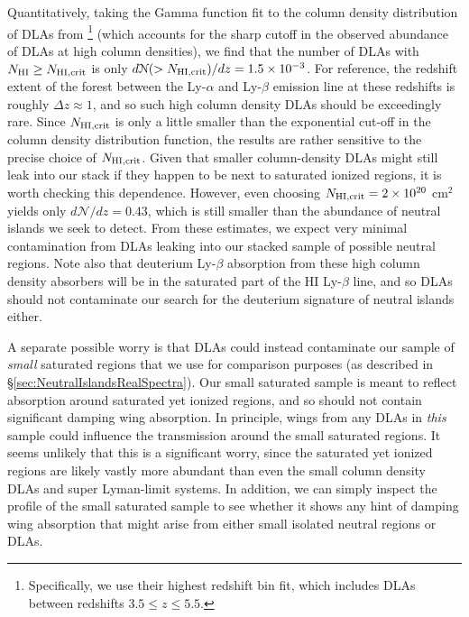 Quantitatively, taking the Gamma function
fit to the column density distribution of DLAs from \citet{Prochaska:2005wy} \footnote{Specifically, we use their highest redshift bin fit, 
which includes DLAs between redshifts $3.5 \leq z \leq 5.5$.} 
(which accounts for the sharp cutoff in the observed abundance of DLAs
at high column densities), we find that the number of DLAs with $N_{\rm HI} \geq N_{\rm HI, crit}$ is only
$d\mathcal{N}(> N_{\rm HI, crit})/dz = 1.5 \times 10^{-3}$. For reference, the redshift extent of the forest 
between the Ly-$\alpha$ and Ly-$\beta$
emission line at these redshifts is roughly $\Delta z \approx 1$, and so such 
high column density DLAs should be exceedingly rare. Since $N_{\rm HI, crit}$ is
only a little smaller than the exponential
cut-off in the column density distribution function, the results are rather 
sensitive to the precise choice of $N_{\rm HI, crit}$. Given that smaller column-density DLAs might still leak into our stack
if they happen to be next to saturated ionized regions, it is worth checking this dependence.
However, even choosing $N_{\rm HI,crit} = 2 \times 10^{20}$ cm$^2$ yields only $d\mathcal{N}/dz = 0.43$, which is still smaller than the abundance of neutral
islands we seek to detect. 
From these
estimates, we expect very minimal contamination from DLAs leaking into our stacked sample of possible neutral regions.
Note also that deuterium Ly-$\beta$ absorption from these high column density absorbers will be in the saturated
part of the HI Ly-$\beta$ line, and so DLAs should not contaminate our search for the deuterium signature of neutral islands either.


A separate possible worry is that DLAs could instead contaminate our sample of {\em small} saturated regions that
we use for comparison purposes (as described in \S \ref{sec:NeutralIslandsRealSpectra}). Our small saturated sample
is meant to reflect absorption around saturated yet ionized regions, and so should not contain
significant damping wing absorption. In principle, wings from any DLAs in {\em this} sample could influence the
transmission around the small saturated regions. It seems unlikely that this is a significant worry, since the
saturated yet ionized regions are likely vastly more abundant than even the small column density DLAs and super Lyman-limit systems. 
In addition, we can simply 
inspect the profile of the small saturated sample to see whether it shows any hint of damping wing absorption that
might arise from either small isolated neutral regions or DLAs.

